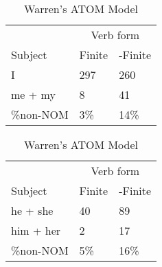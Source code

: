 \begin{table}[]
    \caption{Warren's ATOM Model}
    \begin{minipage}{0.5\textwidth}
    \centering
    \begin{tabular}{@{}lll@{}}
        \toprule
         &\multicolumn{2}{c}{Verb form}\\
         \cline{2-3}
        Subject & Finite & -Finite \\
        \midrule
        I & 297 & 260 \\
        me + my & 8 & 41 \\
        \hline
        \%non-NOM & 3\% & 14\% \\
        \bottomrule
    \end{tabular}
\end{minipage}
\begin{minipage}{0.5\textwidth}
    \centering
    \begin{tabular}{@{}lll@{}}
        \toprule
         &\multicolumn{2}{c}{Verb form}\\
         \cline{2-3}
        Subject & Finite & -Finite \\
        \midrule
        he + she & 40 & 89 \\
        him + her & 2 & 17 \\
        \hline
        \%non-NOM & 5\% & 16\% \\
        \bottomrule
    \end{tabular}
    \end{minipage}
    \begin{minipage}{0.5\textwidth}
    

\end{minipage}
\end{table}
